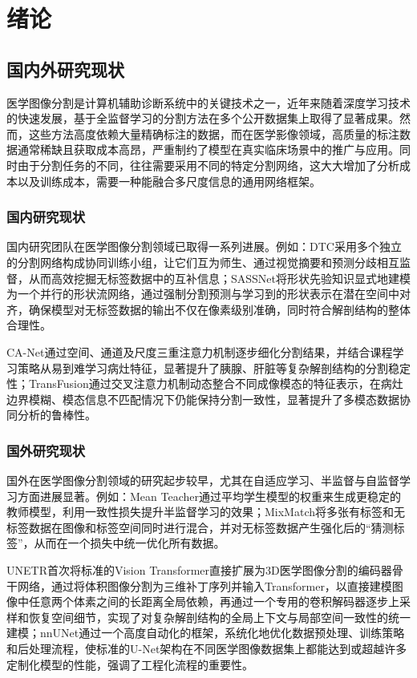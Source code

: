 \documentclass[twoside,openright]{xduugthesis}
\begin{document}
\chapter{绪论}

\section{国内外研究现状}
医学图像分割是计算机辅助诊断系统中的关键技术之一，近年来随着深度学习技术的快速发展，基于全监督学习的分割方法在多个公开数据集上取得了显著成果。然而，这些方法高度依赖大量精确标注的数据，而在医学影像领域，高质量的标注数据通常稀缺且获取成本高昂，严重制约了模型在真实临床场景中的推广与应用。同时由于分割任务的不同，往往需要采用不同的特定分割网络，这大大增加了分析成本以及训练成本，需要一种能融合多尺度信息的通用网络框架。

\subsection{国内研究现状}
国内研究团队在医学图像分割领域已取得一系列进展。例如：DTC\cite{luo2021semi}采用多个独立的分割网络构成协同训练小组，让它们互为师生、通过视觉摘要和预测分歧相互监督，从而高效挖掘无标签数据中的互补信息；SASSNet\cite{li2020shape}将形状先验知识显式地建模为一个并行的形状流网络，通过强制分割预测与学习到的形状表示在潜在空间中对齐，确保模型对无标签数据的输出不仅在像素级别准确，同时符合解剖结构的整体合理性。

CA-Net\cite{gu2020ca}通过空间、通道及尺度三重注意力机制逐步细化分割结果，并结合课程学习策略从易到难学习病灶特征，显著提升了胰腺、肝脏等复杂解剖结构的分割稳定性；TransFusion\cite{bai2022transfusion}通过交叉注意力机制动态整合不同成像模态的特征表示，在病灶边界模糊、模态信息不匹配情况下仍能保持分割一致性，显著提升了多模态数据协同分析的鲁棒性。

\subsection{国外研究现状}
国外在医学图像分割领域的研究起步较早，尤其在自适应学习、半监督与自监督学习方面进展显著。例如：Mean Teacher\cite{tarvainen2017mean}通过平均学生模型的权重来生成更稳定的教师模型，利用一致性损失提升半监督学习的效果；MixMatch\cite{berthelot2019mixmatch}将多张有标签和无标签数据在图像和标签空间同时进行混合，并对无标签数据产生强化后的“猜测标签”，从而在一个损失中统一优化所有数据。

UNETR\cite{hatamizadeh2022unetr}首次将标准的Vision Transformer直接扩展为3D医学图像分割的编码器骨干网络，通过将体积图像分割为三维补丁序列并输入Transformer，以直接建模图像中任意两个体素之间的长距离全局依赖，再通过一个专用的卷积解码器逐步上采样和恢复空间细节，实现了对复杂解剖结构的全局上下文与局部空间一致性的统一建模；nnUNet\cite{isensee2018nnu}通过一个高度自动化的框架，系统化地优化数据预处理、训练策略和后处理流程，使标准的U-Net架构在不同医学图像数据集上都能达到或超越许多定制化模型的性能，强调了工程化流程的重要性。
\end{document}
